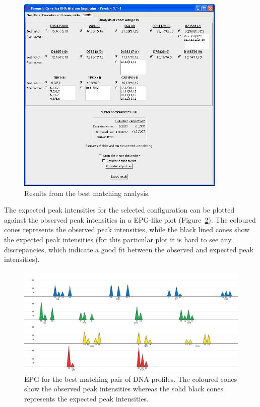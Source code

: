 \documentclass[a4paper,11pt]{article}
\begin{document}
\begin{figure}[!h]
  \centering
  \includegraphics[width=10cm]{result_bestmatch}
  \caption{\label{fig:resultbm}Results from the best matching analysis.}
\end{figure}

The expected peak intensities for the selected configuration can be
plotted against the observed peak intensities in a EPG-like plot
(Figure~\ref{fig:plotbm}). The coloured cones represents the observed
peak intensities, while the black lined cones show the expected peak
intensities (for this particular plot it is hard to see any
discrepancies, which indicate a good fit between the observed and
expected peak intensities).

\begin{figure}[!h]
  \centering
  \includegraphics[width=15cm]{plot_bestmatch}
  \caption{\label{fig:plotbm}EPG for the best matching pair of DNA
    profiles. The coloured cones show the observed peak intensities
    whereas the solid black cones represents the expected peak
    intensities.}
\end{figure}
\end{document}
